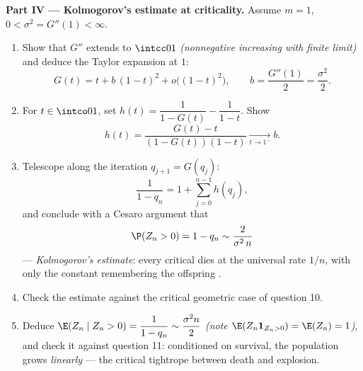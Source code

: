 \begin{problem}
\medskip
\noindent\textbf{Part IV --- Kolmogorov's estimate at
criticality.} Assume $m = 1$, $0 < \sigma^2 = G''(1) <
\infty$.
\begin{enumerate}[resume]
  \item Show that $G''$ extends  to $\intcc01$
        \emph{(nonnegative increasing with finite limit)} and
        deduce the Taylor expansion at $1$:
        \[
        G(t) = t + b\,(1-t)^2 + o\bigl((1-t)^2\bigr),
        \qquad b = \frac{G''(1)}2 = \frac{\sigma^2}2 .
        \]
  \item For $t \in \intco01$, set $h(t) = \dfrac1{1 - G(t)} -
        \dfrac1{1 - t}$. Show
        \[
        h(t) = \frac{G(t) - t}{(1 - G(t))(1 - t)}
        \xrightarrow[t\to1^-]{} b .
        \]
  \item Telescope along the iteration $q_{j+1} = G(q_j)$:
        \[
        \frac1{1 - q_n} = 1 + \sum_{j=0}^{n-1}h(q_j),
        \]
        and conclude with a Cesaro argument that
        \[
        \P(Z_n > 0) = 1 - q_n \sim \frac{2}{\sigma^2\,n}
        \]
        --- \emph{Kolmogorov's estimate}: every critical
         dies at the universal rate $1/n$,
        with only the constant remembering the offspring .
  \item Check the estimate against the critical geometric
        case of question 10.
  \item Deduce $\E(Z_n \mid Z_n > 0) = \dfrac{1}{1 - q_n}
        \sim \dfrac{\sigma^2 n}{2}$ \emph{(note $\E(Z_n
        \mathbf 1_{Z_n>0}) = \E(Z_n) = 1$)}, and check it
        against question 11: conditioned on survival, the
        population grows \emph{linearly} --- the critical
        tightrope between death and explosion.
\end{enumerate}


\end{problem}
